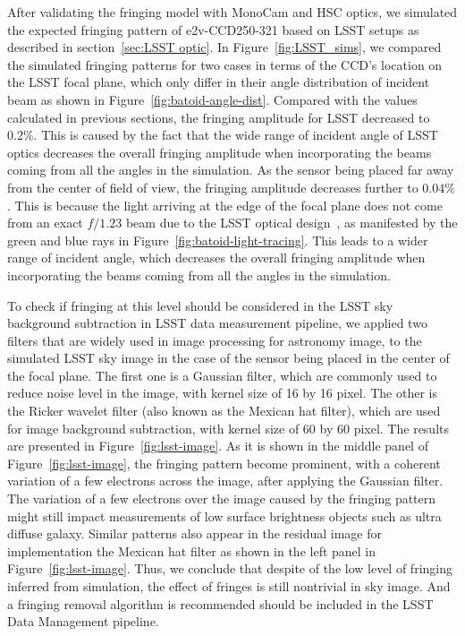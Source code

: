 \documentclass[twocolumn]{aastex63} %
\begin{document}
\begin{CJK*}{UTF8}{gbsn}
After validating the fringing model with MonoCam and HSC optics, we simulated the expected fringing pattern of e2v-CCD250-321 based on LSST setups as described in section~\ref{sec:LSST optic}.  In Figure~\ref{fig:LSST_sims}, we compared the simulated fringing patterns for two cases in terms of the CCD's location on the LSST focal plane, which only differ in their angle distribution of incident beam as shown in Figure~\ref{fig:batoid-angle-dist}. Compared with the values calculated in previous sections, the fringing amplitude for LSST decreased to $0.2\%$. This is caused by the fact that the wide range of incident angle of LSST optics decreases the overall fringing amplitude when incorporating the beams coming from all the angles in the simulation. As the sensor being placed far away from the center of field of view, the fringing amplitude decreases further to $0.04\%$. This is because the light arriving at the edge of the focal plane does not come from an exact $f/1.23$ beam due to the LSST optical design~\citep{Olivier08}, as manifested by the green and blue rays in Figure~\ref{fig:batoid-light-tracing}. This leads to a wider range of incident angle, which decreases the overall fringing amplitude when incorporating the beams coming from all the angles in the simulation. 

To check if fringing at this level should be considered in the LSST sky background subtraction in LSST data measurement pipeline, we applied two filters that are widely used in image processing for astronomy image, to the simulated LSST sky image in the case of the sensor being placed in the center of the focal plane. The first one is a Gaussian filter, which are commonly used to reduce noise level in the image, with kernel size of 16 by 16 pixel. The other is the Ricker wavelet filter (also known as the Mexican hat filter), which are used for image background subtraction, with kernel size of 60 by 60 pixel. The results are presented in Figure~\ref{fig:lsst-image}. As it is shown in the middle panel of Figure~\ref{fig:lsst-image}, the fringing pattern become prominent, with a coherent variation of a few electrons across the image, after applying the Gaussian filter. The variation of a few electrons over the image caused by the fringing pattern might still impact measurements of low surface brightness objects such as ultra diffuse galaxy. Similar patterns also appear in the residual image for implementation the Mexican hat filter as shown in the left panel in Figure~\ref{fig:lsst-image}. Thus, we conclude that despite of the low level of fringing inferred from simulation, the effect of fringes is still nontrivial in sky image. And a fringing removal algorithm is recommended should be included in the LSST Data Management pipeline.


\end{CJK*}
\end{document}
